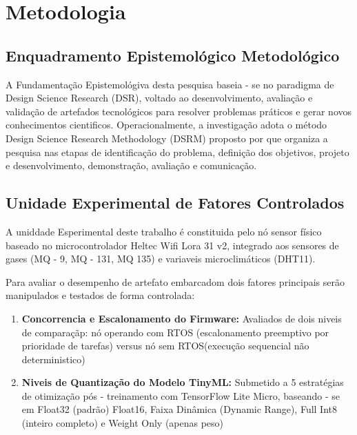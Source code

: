 \chapter{Metodologia}
\section{Enquadramento Epistemológico Metodológico}
A Fundamentação Epistemológiva desta pesquisa baseia - se no paradigma de Design Science Research
(DSR), voltado ao desenvolvimento, avaliação e validação de artefados tecnológicos para resolver 
problemas práticos e gerar novos conhecimentos cientificos. Operacionalmente, a investigação
adota o método Design Science Research Methodology (DSRM) proposto por 
que organiza a pesquisa nas etapas de identificação do problema, definição dos objetivos, projeto
e desenvolvimento, demonstração, avaliação e comunicação.
\section{Unidade Experimental de Fatores Controlados}
A uniddade Esperimental deste trabalho é constituida pelo nó sensor físico baseado no microcontrolador
Heltec Wifi Lora 31 v2, integrado aos sensores de gases (MQ - 9, MQ - 131, MQ 135) e variaveis
microclimáticos (DHT11).

Para avaliar o desempenho de artefato embarcadom dois fatores principais serão manipulados e
testados de forma controlada:

\begin{enumerate}
    \item \textbf{Concorrencia e Escalonamento do Firmware:} Avaliados de dois niveis de comparaçãp:
                                                             nó operando com RTOS (escalonamento preemptivo 
                                                             por prioridade de tarefas) versus nó sem RTOS(execução
                                                             sequencial não deterministico)
    \item \textbf{Niveis de Quantização do Modelo TinyML:}  Submetido a 5 estratégias de otimização pós - treinamento
                                                            com TensorFlow Lite Micro, baseando - se em 
                                                            Float32 (padrão) Float16, Faixa Dinâmica (Dynamic Range), Full Int8 (inteiro
                                                            completo) e Weight Only (apenas peso)
\end{enumerate}

